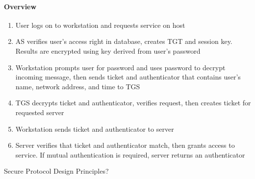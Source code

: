 \paragraph{Overview}
\begin{enumerate}
    \item User logs on to workstation and requests service on host
    \item AS verifies user's access right in database, creates TGT and session key. Results are encrypted using key derived from user's password
    \item Workstation prompts user for password and uses password to decrypt incoming message, then sends ticket and authenticator that contains user's name, network address, and time to TGS
    \item TGS decrypts ticket and authenticator, verifies request, then creates ticket for requested server
    \item Workstation sends ticket and authenticator to server
    \item Server verifies that ticket and authenticator match, then grants access to service. If mutual authentication is required, server returns an authenticator
\end{enumerate}

{\color{red} Secure Protocol Design Principles?}